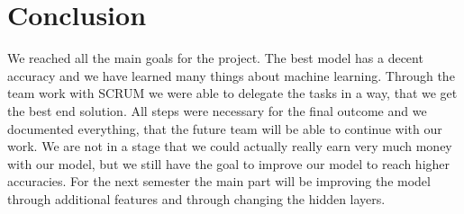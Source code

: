 
\chapter{Conclusion}
\label{chap:conclusion}
We reached all the main goals for the project. The best model has a decent accuracy and we have learned many things about machine learning. Through the team work with SCRUM we were able to delegate the tasks in a way, that we get the best end solution. All steps were necessary for the final outcome and we documented everything, that the future team will be able to continue with our work. We are not in a stage that we could actually really earn very much money with our model, but we still have the goal to improve our model to reach higher accuracies. For the next semester the main part will be improving the model through additional features and through changing the hidden layers.
